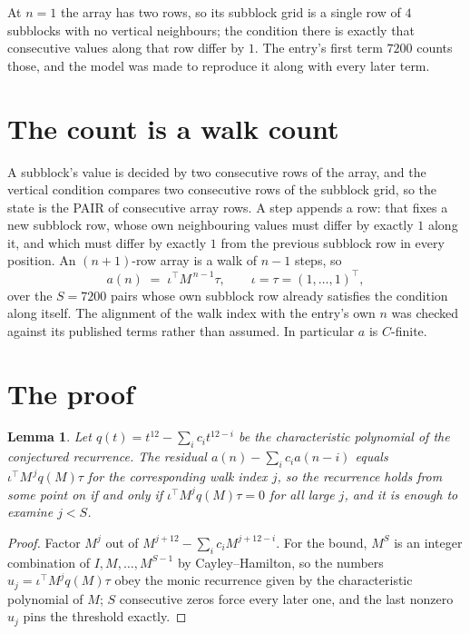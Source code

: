 \documentclass[11pt,a4paper]{article}
\theoremstyle{plain}
\newtheorem{lemma}[theorem]{Lemma}
\theoremstyle{definition}
\begin{document}
At $n=1$ the array has two rows, so its subblock grid is a single row of $4$ subblocks with
no vertical neighbours; the condition there is exactly that consecutive values along that row
differ by $1$. The entry's first term $7200$ counts those, and the model was made to
reproduce it along with every later term.

\section{The count is a walk count}

A subblock's value is decided by two consecutive rows of the array, and the
vertical condition compares two consecutive rows of the subblock grid, so the state is the
PAIR of consecutive array rows. A step appends a row: that fixes a new subblock row, whose own
neighbouring values must differ by exactly $1$ along it, and which must differ by exactly
$1$ from the previous subblock row in every position. An $(n+1)$-row array is a walk of
$n-1$ steps, so
\[
a(n)\;=\;\iota^{\!\top}M^{\,n-1}\tau,\qquad\iota=\tau=(1,\dots,1)^{\!\top},
\]
over the $S=7200$ pairs whose own subblock row already satisfies the condition along itself.
The alignment of the walk index with the entry's own $n$ was checked against its published
terms rather than assumed. In particular $a$ is $C$-finite.

\section{The proof}

\begin{lemma}\label{lem:crit}
Let $q(t)=t^{12}-\sum_i c_it^{12-i}$ be the characteristic polynomial of the
conjectured recurrence. The residual $a(n)-\sum_ic_ia(n-i)$ equals
$\iota^{\!\top}M^{\,j}q(M)\tau$ for the corresponding walk index $j$, so the recurrence
holds from some point on if and only if $\iota^{\!\top}M^{j}q(M)\tau=0$ for all large $j$,
and it is enough to examine $j<S$.
\end{lemma}

\begin{proof}
Factor $M^{j}$ out of $M^{j+12}-\sum_ic_iM^{j+12-i}$. For the bound, $M^{S}$
is an integer combination of $I,M,\dots,M^{S-1}$ by Cayley--Hamilton, so the numbers
$u_j=\iota^{\!\top}M^{j}q(M)\tau$ obey the monic recurrence given by the characteristic
polynomial of $M$; $S$ consecutive zeros force every later one, and the last nonzero $u_j$
pins the threshold exactly.
\end{proof}
\end{document}
